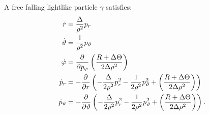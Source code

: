 \begin{theorem}
	\label{theo:eqsmotion}
	A free falling lightlike particle $\gamma$ satisfies:
	\begin{align}
		\dot{r} &= \frac{\Delta}{\rho^2} p_r \\
		\dot{\vartheta} &= \frac{1}{\rho^2}p_\vartheta \\
		\dot{\varphi} &= \frac{\partial^{} }{\partial p_\varphi}\left( \frac{R + \Delta\Theta}{2\Delta\rho^2} \right) \\
		\dot{p}_r &= - \frac{\partial^{} }{\partial r} \left( - \frac{\Delta}{2\rho^2}p_r^2 - \frac{1}{2\rho^2}p_\vartheta^2 + \left( \frac{R + \Delta\Theta}{2\Delta\rho^2} \right) \right) \\
		\dot{p}_\vartheta &= - \frac{\partial^{} }{\partial \vartheta} \left( - \frac{\Delta}{2\rho^2}p_r^2 - \frac{1}{2\rho^2}p_\vartheta^2 + \left( \frac{R + \Delta\Theta}{2\Delta\rho^2} \right) \right).
	\end{align}
\end{theorem}